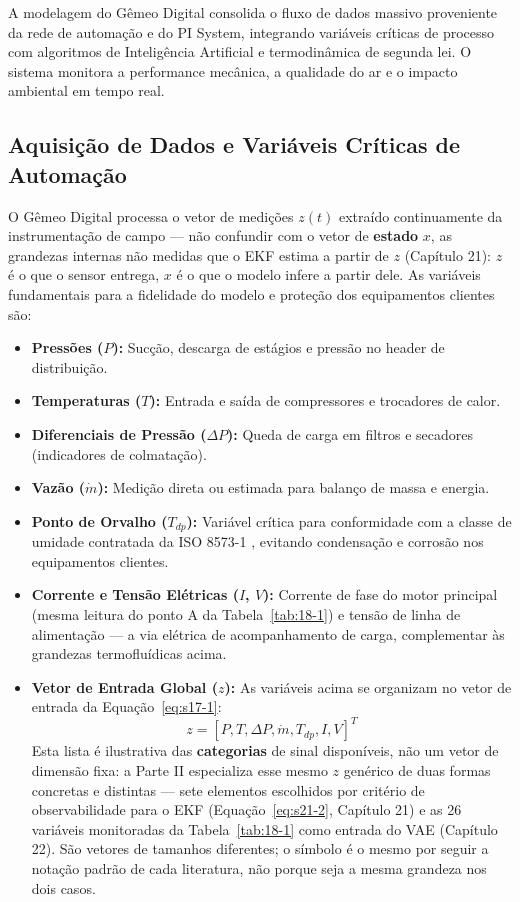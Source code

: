 \documentclass[12pt,a4paper]{article}
\numberwithin{equation}{section}
\numberwithin{table}{section}
\numberwithin{figure}{section}
\begin{document}
A modelagem do Gêmeo Digital consolida o fluxo de dados massivo proveniente da rede de automação e do PI System, integrando variáveis críticas de processo com algoritmos de Inteligência Artificial e termodinâmica de segunda lei. O sistema monitora a performance mecânica, a qualidade do ar e o impacto ambiental em tempo real.

\subsection{Aquisição de Dados e Variáveis Críticas de Automação}

O Gêmeo Digital processa o vetor de medições $z(t)$ extraído continuamente da instrumentação de campo — não confundir com o vetor de \textbf{estado} $x$, as grandezas internas não medidas que o EKF estima a partir de $z$ (Capítulo 21): $z$ é o que o sensor entrega, $x$ é o que o modelo infere a partir dele. As variáveis fundamentais para a fidelidade do modelo e proteção dos equipamentos clientes são:

\begin{itemize}
	\item \textbf{Pressões ($P$):} Sucção, descarga de estágios e pressão no header de distribuição.
	\item \textbf{Temperaturas ($T$):} Entrada e saída de compressores e trocadores de calor.
	\item \textbf{Diferenciais de Pressão ($\Delta P$):} Queda de carga em filtros e secadores (indicadores de colmatação).
	\item \textbf{Vazão ($\dot{m}$):} Medição direta ou estimada para balanço de massa e energia.
	\item \textbf{Ponto de Orvalho ($T_{dp}$):} Variável crítica para conformidade com a classe de umidade contratada da ISO 8573-1 \cite{iso8573}, evitando condensação e corrosão nos equipamentos clientes.
	\item \textbf{Corrente e Tensão Elétricas ($I$, $V$):} Corrente de fase do motor principal (mesma leitura do ponto A da Tabela~\ref{tab:18-1}) e tensão de linha de alimentação — a via elétrica de acompanhamento de carga, complementar às grandezas termofluídicas acima.
	\item \textbf{Vetor de Entrada Global ($z$):} As variáveis acima se organizam no vetor de entrada da Equação~\eqref{eq:s17-1}:
	\begin{equation}\label{eq:s17-1}
z = [P, T, \Delta P, \dot{m}, T_{dp}, I, V]^T
\end{equation}
	Esta lista é ilustrativa das \textbf{categorias} de sinal disponíveis, não um vetor de dimensão fixa: a Parte II especializa esse mesmo $z$ genérico de duas formas concretas e distintas — sete elementos escolhidos por critério de observabilidade para o EKF (Equação~\eqref{eq:s21-2}, Capítulo 21) e as 26 variáveis monitoradas da Tabela~\ref{tab:18-1} como entrada do VAE (Capítulo 22). São vetores de tamanhos diferentes; o símbolo é o mesmo por seguir a notação padrão de cada literatura, não porque seja a mesma grandeza nos dois casos.
\end{itemize}
\end{document}
